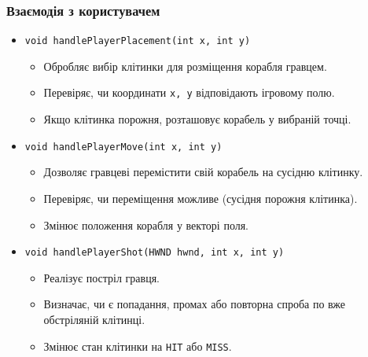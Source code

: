 \documentclass[12pt]{article}
\begin{document}
\subsubsection{Взаємодія з користувачем}
\begin{itemize}
    \item \texttt{void handlePlayerPlacement(int x, int y)}
    \begin{itemize}
        \item Обробляє вибір клітинки для розміщення корабля гравцем.
        \item Перевіряє, чи координати \texttt{x, y} відповідають ігровому полю.
        \item Якщо клітинка порожня, розташовує корабель у вибраній точці.
    \end{itemize}
    \item \texttt{void handlePlayerMove(int x, int y)}
    \begin{itemize}
        \item Дозволяє гравцеві перемістити свій корабель на сусідню клітинку.
        \item Перевіряє, чи переміщення можливе (сусідня порожня клітинка).
        \item Змінює положення корабля у векторі поля.
    \end{itemize}
    \item \texttt{void handlePlayerShot(HWND hwnd, int x, int y)}
    \begin{itemize}
        \item Реалізує постріл гравця.
        \item Визначає, чи є попадання, промах або повторна спроба по вже обстріляній клітинці.
        \item Змінює стан клітинки на \texttt{HIT} або \texttt{MISS}.
    \end{itemize}
\end{itemize}
\end{document}
